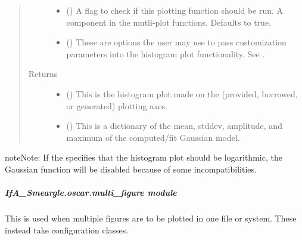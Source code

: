 \documentclass[letterpaper,10pt,english]{sphinxmanual}
\begin{document}
\begin{fulllineitems}
\begin{quote}
\begin{description}
\begin{itemize}
\item {} 
 (\sphinxstyleliteralemphasis{\sphinxupquote{ (}}\sphinxstyleliteralemphasis{\sphinxupquote{)}}) \textendash{} A flag to check if this plotting function should be run. A component
in the mutli-plot functions. Defaults to true.

\item {} 
 () \textendash{} These are options the user may use to pass customization parameters
into the histogram plot functionality.
See .

\end{itemize}

\item[{Returns}] \leavevmode
\begin{itemize}
\item {} 
 () \textendash{} This is the histogram plot made on the (provided, borrowed, or
generated) plotting axes.

\item {} 
 () \textendash{} This is a dictionary of the mean, stddev, amplitude, and maximum of
the computed/fit Gaussian model.

\end{itemize}


\end{description}\end{quote}

\begin{sphinxadmonition}{note}{Note:}
If the  specifies that the histogram plot
should be logarithmic, the Gaussian function will be disabled because of
some incompatibilities.
\end{sphinxadmonition}

\end{fulllineitems}



\subparagraph{IfA\_Smeargle.oscar.multi\_figure module}
\label{\detokenize{python_docstrings/IfA_Smeargle.oscar.multi_figure:module-IfA_Smeargle.oscar.multi_figure}}\label{\detokenize{python_docstrings/IfA_Smeargle.oscar.multi_figure:ifa-smeargle-oscar-multi-figure-module}}\label{\detokenize{python_docstrings/IfA_Smeargle.oscar.multi_figure::doc}}
This is used when multiple figures are to be plotted in one file or system.
These instead take configuration classes.
\end{document}
